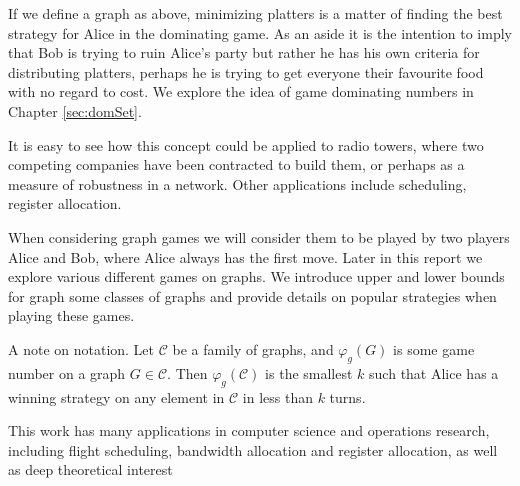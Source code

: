 If we define a graph as above, minimizing platters is a matter of finding the best strategy for Alice in the dominating game. 
As an aside it is the intention to imply that Bob is trying to ruin Alice's party but rather he has his own criteria for distributing platters, perhaps he is trying to get everyone their favourite food with no regard to cost. We explore the idea of game dominating numbers in Chapter \ref{sec:domSet}.

It is easy to see how this concept could be applied to radio towers, where two competing companies have been contracted to build them, or perhaps as a measure of robustness in a network. Other applications include scheduling, register allocation.  

When considering graph games we will consider them to be played by two players Alice and Bob, where Alice always has the first move. Later in this report we explore various different games on graphs. We introduce upper and lower bounds for graph some classes of graphs and provide details on popular strategies when playing these games.   




A note on notation. Let $\mathcal{C}$ be a family of graphs, and $\varphi_g(G)$ is some game number on a graph $G \in \mathcal{C}$. Then $\varphi_g(\mathcal{C})$ is the smallest $k$ such that Alice has a winning strategy on any element in $\mathcal{C}$ in less than $k$ turns.
   
    
This work has many applications in computer science and operations research, including flight scheduling, bandwidth allocation and register allocation, as well as deep theoretical interest%
    
    
    
    
    
    
    
    
    
    
    
    
    
    
    
    
    
    
    
    
    
    
    